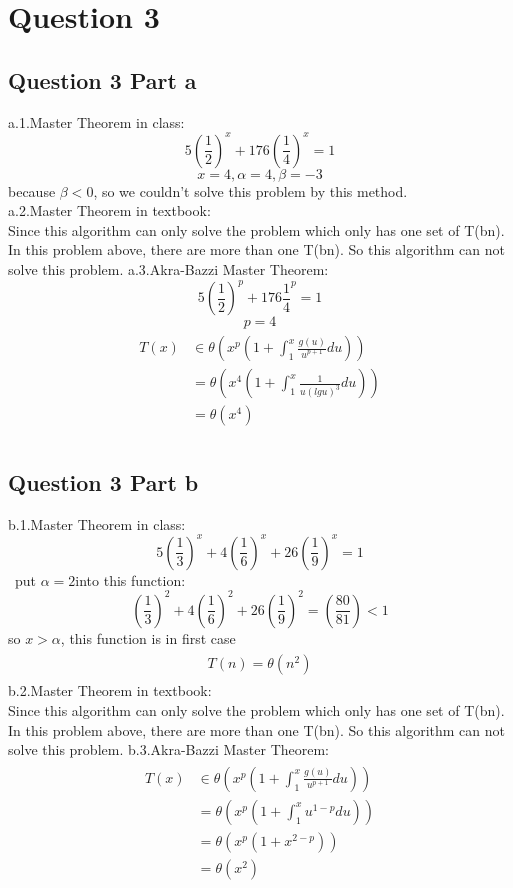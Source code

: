 \documentclass[paper=a4, fontsize=11pt]{scrartcl} %
\numberwithin{equation}{section} %
\numberwithin{figure}{section} %
\numberwithin{table}{section} %
\begin{document}
\vspace{2cm}
\section{Question 3}
\subsection{Question 3 Part a}
a.1.Master Theorem in class:
$$5(\frac{1}{2})^x+176(\frac{1}{4})^x=1$$
$$ x=4, \alpha=4 , \beta=-3$$
because $ \beta<0 $, so we couldn't solve this problem by this method.\\
a.2.Master Theorem in textbook:\\
Since this algorithm can only solve the problem which only has one set of T(bn). In this problem above, there are more than one T(bn). So this algorithm can not solve this problem.
a.3.Akra-Bazzi Master Theorem:\\
$$5(\frac{1}{2})^p+176{\frac{1}{4}}^p=1  $$
$$ p=4 $$
\begin{align*}
\begin{split}
T(x) &\in\theta(x^p(1+\int_{1}^{x}{\frac{g(u)}{u^{p+1}}du}))\\
&=\theta(x^4(1+\int_{1}^{x}{\frac{1}{u{(lgu)}^3}du}))\\
&=\theta(x^4)\\
\end{split}
\end{align*}

\subsection{Question 3 Part b}
b.1.Master Theorem in class:
$$5(\frac{1}{3})^x+4(\frac{1}{6})^x+26(\frac{1}{9})^x=1$$\
put $\alpha=2 $into this function:
$$(\frac{1}{3})^2+4(\frac{1}{6})^2+26(\frac{1}{9})^2=(\frac{80}{81})<1$$
so $x>\alpha$, this function is in first case
\begin{align*}
\begin{split}
T(n)=\theta(n^{2})
\end{split}
\end{align*}
b.2.Master Theorem in textbook:\\
Since this algorithm can only solve the problem which only has one set of T(bn). In this problem above, there are more than one T(bn). So this algorithm can not solve this problem.
b.3.Akra-Bazzi Master Theorem:\\
\begin{align*}
\begin{split}
T(x) &\in\theta(x^p(1+\int_{1}^{x}{\frac{g(u)}{u^{p+1}}du}))\\
&=\theta(x^p(1+\int_{1}^{x}{{u}^{1-p}du}))\\
&=\theta(x^p(1+{x}^{2-p}))\\
&=\theta{(x^2)}\\
\end{split}
\end{align*}
\end{document}
